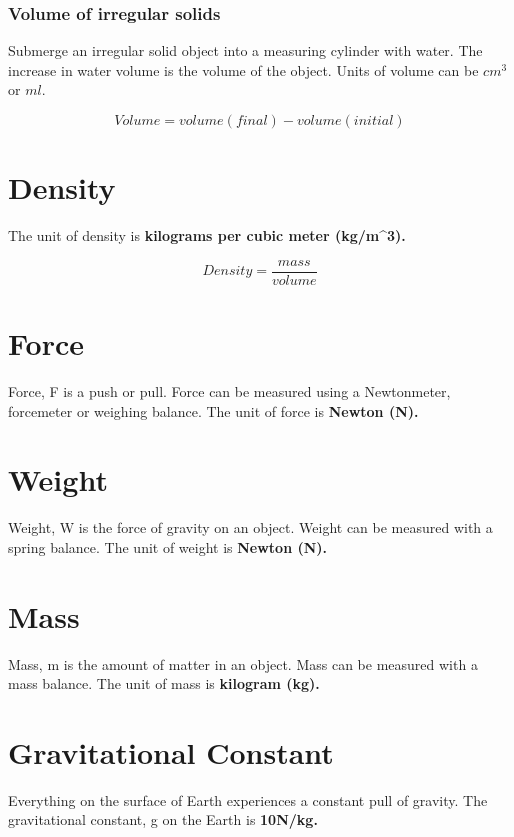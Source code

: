 \documentclass{report}
\begin{document}
\begin{flushleft}
\subsubsection*{Volume of irregular solids} 
\normalfont Submerge an irregular solid object into a measuring cylinder with water. The increase in water volume is the volume of the object. Units of volume can be $cm^3$ or $ml$.

\vspace{3mm} 

\begin{equation}
Volume = volume(final) - volume(initial)
\end{equation}

\section*{Density}
\normalfont The unit of density is \bf{kilograms per cubic meter (kg/m^3)}. 

\begin{equation}
Density = \frac{mass}{volume}
\end{equation}

\section*{Force}
\normalfont Force, F is a push or pull. Force can be measured using a Newtonmeter, forcemeter or weighing balance. The unit of force is \bf{Newton (N)}. 

\section*{Weight}
\normalfont Weight, W is the force of gravity on an object. Weight can be measured with a spring balance. The unit of weight is \bf{Newton (N)}.

\section*{Mass}
\normalfont Mass, m is the amount of matter in an object. Mass can be measured with a mass balance. The unit of mass is \bf{kilogram (kg)}. 
\section*{Gravitational Constant}
\normalfont Everything on the surface of Earth experiences a constant pull of gravity. The gravitational constant, g on the Earth is \bf{10N/kg}.


\end{flushleft}
\end{document}

